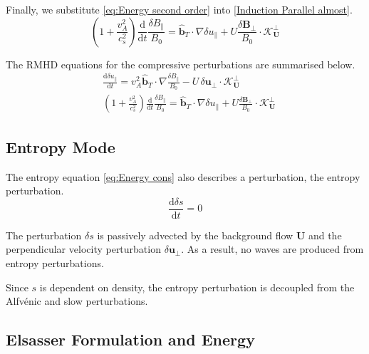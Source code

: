 Finally, we substitute \eqref{eq:Energy second order} into \eqref{Induction Parallel almost}. 
\begin{equation}
    \left(1+\frac{v_A^2}{c_s^2}\right)\frac{\mathrm{d}}{\mathrm{d}t} \frac{\delta B_{\parallel}}{B_0}   = \hat{\boldsymbol{b}}_{T}  \cdot \nabla\delta u_{\parallel} + U \frac{\delta \boldsymbol{B}_{\perp}}{B_{0}} \cdot \boldsymbol{\mathcal{K}^{\perp}_{U}}
    \label{Induction Parallel}
\end{equation}

The RMHD equations for the compressive perturbations are summarised below.
\begin{equation}
\begin{split}
    &\frac{\mathrm{d} \delta u_{\parallel}}{\mathrm{d}t}= v_A^2 \hat{\boldsymbol{b}}_{T}  \cdot \nabla \frac{\delta B_{\parallel}}{B_0} -  U\,\delta \boldsymbol{u}_{\perp} \cdot \boldsymbol{\mathcal{K}^{\perp}_{U}}\\
    &\left(1+\frac{v_A^2}{c_s^2}\right)\frac{\mathrm{d}}{\mathrm{d}t} \frac{\delta B_{\parallel}}{B_0}   = \hat{\boldsymbol{b}}_{T}  \cdot \nabla\delta u_{\parallel} + U \frac{\delta \boldsymbol{B}_{\perp}}{B_{0}} \cdot \boldsymbol{\mathcal{K}^{\perp}_{U}}
    \label{eq:RMHD parallel}
\end{split}
\end{equation}

\subsection{Entropy Mode}
The entropy equation \eqref{eq:Energy cons} also describes a perturbation, the entropy perturbation. 
\begin{equation}
     \frac{\mathrm{d} \delta s}{ \mathrm{d}t}=0
\end{equation}

The perturbation \(\delta s\) is passively advected by the background flow \(\boldsymbol{U}\) and the perpendicular velocity perturbation \(\delta \boldsymbol{u}_{\perp}\). As a result, no waves are produced from entropy perturbations.

Since \(s\) is dependent on density, the entropy perturbation is decoupled from the Alfv\'enic and slow perturbations. 


\subsection{Elsasser Formulation and Energy}
